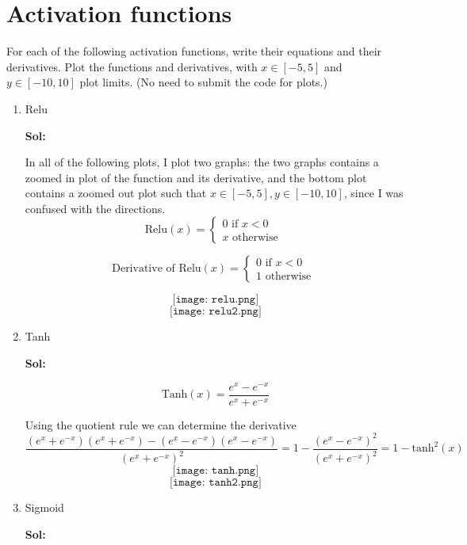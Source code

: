\documentclass[11pt]{article}
\begin{document}
  \newpage




\section{Activation functions}
For each of the following activation functions, write their equations and their derivatives. Plot the functions and derivatives, with $x\in \left[-5, 5\right]$ and $y\in\left[-10,10\right]$ plot limits. (No need to submit the code for plots.)

\begin{enumerate}
    \item Relu
    
    \textbf{Sol:}

    In all of the following plots, I plot two graphs: the two graphs contains a zoomed in plot
    of the function and its derivative, and the bottom plot contains a zoomed out plot 
    such that $x\in[-5, 5], y \in [-10, 10]$, since I was confused with the directions.
    \[\text{Relu}(x) = \begin{cases}
      0 \text{ if } x < 0\\ 
      x \text{ otherwise }
    \end{cases}\]

    \[\text{Derivative of Relu}(x) = \begin{cases}
      0 \text{ if } x < 0\\
      1 \text{ otherwise } 
    \end{cases}\]

    \[\texttt{[image: relu.png]}\]
    \[\texttt{[image: relu2.png]}\]
  
  \newpage
  
    \item Tanh
    
    \textbf{Sol:}

    \[\text{Tanh}(x) = \dfrac{e^x - e^{-x}}{e^x + e^{-x}}\]

    Using the quotient rule we can determine the derivative
    \[\dfrac{(e^x + e^{-x})(e^x + e^{-x}) - (e^x - e^{-x})(e^x - e^{-x})}{(e^x + e^{-x})^2} = 1 - \frac{(e^x - e^{-x})^2}{(e^x + e^{-x})^2} = 1 - \text{tanh}^2(x)\]
    \[\texttt{[image: tanh.png]}\]
    \[\texttt{[image: tanh2.png]}\]


  \newpage
  
    \item Sigmoid
    
    \textbf{Sol:}


\end{enumerate}
\end{document}
